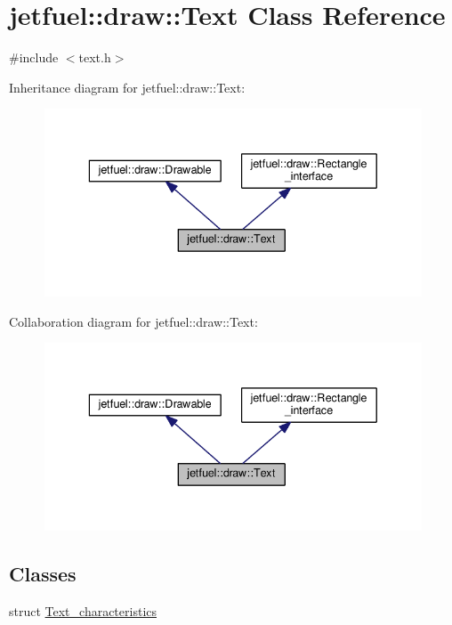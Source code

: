 \hypertarget{classjetfuel_1_1draw_1_1Text}{}\section{jetfuel\+:\+:draw\+:\+:Text Class Reference}
\label{classjetfuel_1_1draw_1_1Text}


{\ttfamily \#include $<$text.\+h$>$}



Inheritance diagram for jetfuel\+:\+:draw\+:\+:Text\+:\nopagebreak
\begin{figure}[H]
\begin{center}
\leavevmode
\includegraphics[width=336pt]{classjetfuel_1_1draw_1_1Text__inherit__graph}
\end{center}
\end{figure}


Collaboration diagram for jetfuel\+:\+:draw\+:\+:Text\+:\nopagebreak
\begin{figure}[H]
\begin{center}
\leavevmode
\includegraphics[width=336pt]{classjetfuel_1_1draw_1_1Text__coll__graph}
\end{center}
\end{figure}
\subsection*{Classes}
\begin{DoxyCompactItemize}
\item 
struct \hyperlink{structjetfuel_1_1draw_1_1Text_1_1Text__characteristics}{Text\+\_\+characteristics}
\end{DoxyCompactItemize}
